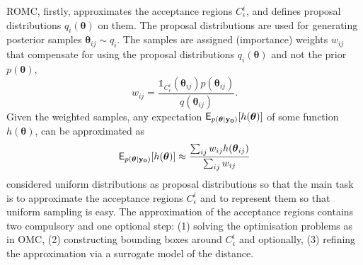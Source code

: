 \documentclass[article]{jss}
\newcommand{\thetab}{\boldsymbol{\theta}}
\newcommand{\indicator}[1]{\mathbb{1}_{#1}}
\newcommand{\data}{\mathbf{y_0}}
\newcommand{\accregioni}{C^i_{\epsilon}}
\begin{document}
ROMC, firstly, approximates the acceptance regions \(\accregioni\),
and defines proposal distributions \(q_i(\thetab)\) on them. The
proposal distributions are used for generating posterior samples
\(\thetab_{ij} \sim q_i\). The samples are assigned (importance)
weights \(w_{ij}\) that compensate for using the proposal
distributions \(q_i(\thetab)\) and not the prior \(p(\thetab)\),
\begin{equation}
  w_{ij} = \frac{\indicator{\accregioni}(\thetab_{ij}) p(\thetab_{ij})}{q(\thetab_{ij})}.
  \label{eq:sampling}
\end{equation}
Given the weighted samples, any expectation
\(\E_{p(\thetab|\data)}[h(\thetab)]\) of some function \(h(\thetab)\), can be approximated as
\begin{equation} \label{eq:expectation}
  \E_{p(\thetab|\data)}[h(\thetab)] \approx \frac{\sum_{ij} w_{ij} h(\thetab_{ij})}{\sum_{ij} w_{ij}}
\end{equation}
\citet{Ikonomov2019} considered uniform distributions as proposal
distributions so that the main task is to approximate the acceptance
regions \(\accregioni\) and to represent them so that uniform sampling
is easy. The approximation of the acceptance regions contains two
compulsory and one optional step: (1) solving the optimisation
problems as in OMC, (2) constructing bounding boxes around
\(\accregioni\) and optionally, (3) refining the approximation via a
surrogate model of the distance.
\end{document}
